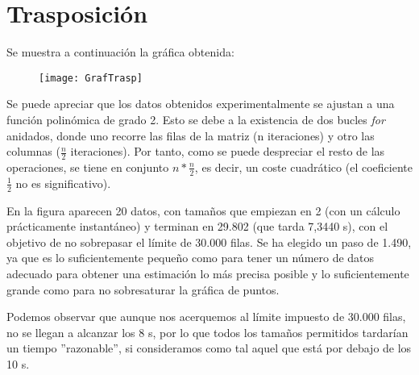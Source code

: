 \documentclass[a4paper,12pt]{article}
\begin{document}
\section*{Trasposición}
Se muestra a continuación la gráfica obtenida:\par
\begin{figure}[h]
	\centering
		\texttt{[image: GrafTrasp]}
\end{figure}
Se puede apreciar que los datos obtenidos experimentalmente se ajustan a una función polinómica de grado 2. Esto se debe a la existencia de dos bucles \emph{for} anidados, donde uno recorre las filas de la matriz (n iteraciones) y otro las columnas ($\frac{n}{2}$ iteraciones). Por tanto, como se puede despreciar el resto de las operaciones, se tiene en conjunto $n*\frac{n}{2}$, es decir, un coste cuadrático (el coeficiente $\frac{1}{2}$ no es significativo).\par
\pagestyle{plain}
En la figura aparecen 20 datos, con tamaños que empiezan en 2 (con un cálculo prácticamente instantáneo) y terminan en 29.802
(que tarda 7,3440 s), con el objetivo de no sobrepasar el límite de 30.000 filas. Se ha elegido un paso de 1.490, ya que es lo suficientemente pequeño como para tener un número de datos adecuado para obtener una estimación lo más precisa posible y lo suficientemente grande como para no sobresaturar la gráfica de puntos.\par
Podemos observar que aunque nos acerquemos al límite impuesto de 30.000 filas, no se llegan a alcanzar los 8 s, por lo que todos los tamaños permitidos tardarían un tiempo ''razonable'', si consideramos como tal aquel que está por debajo de los 10 s.
\end{document}
